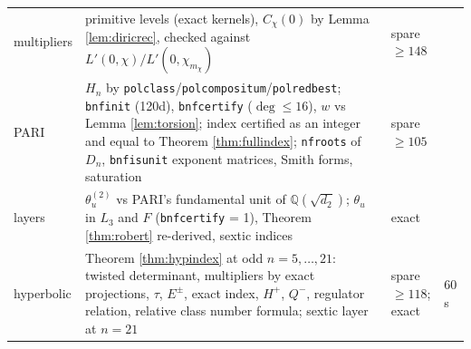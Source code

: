 \documentclass[11pt]{amsart}
\numberwithin{equation}{section}
\theoremstyle{plain}
\theoremstyle{definition}
\theoremstyle{remark}
\newcommand{\Q}{\mathbb{Q}}
\begin{document}
\begin{center}
\begin{tabular}{@{}p{2.6cm}p{5.8cm}p{2.0cm}p{1.4cm}@{}}
\quad multipliers & primitive levels (exact kernels), $C_\chi(0)$ by Lemma \ref{lem:diricrec}, checked against $L'(0,\chi)/L'(0,\chi_{m_\chi})$ & spare $\ge 148$ & \\
\quad PARI & $H_n$ by \texttt{polclass}/\texttt{polcompositum}/\texttt{polredbest}; \texttt{bnfinit} (120d), \texttt{bnfcertify} ($\deg \le 16$), $w$ vs Lemma \ref{lem:torsion}; index certified as an integer and equal to Theorem \ref{thm:fullindex}; \texttt{nfroots} of $D_n$, \texttt{bnfisunit} exponent matrices, Smith forms, saturation & spare $\ge 105$ & \\
\quad layers & $\theta^{(2)}_u$ vs PARI's fundamental unit of $\Q(\sqrt{d_2})$; $\theta_u$ in $L_3$ and $F$ (\texttt{bnfcertify} = 1), Theorem \ref{thm:robert} re-derived, sextic indices & exact & \\
\quad hyperbolic & Theorem \ref{thm:hypindex} at odd $n = 5, \dots, 21$: twisted determinant, multipliers by exact projections, $\tau$, $E^\pm$, exact index, $H^+$, $Q^-$, regulator relation, relative class number formula; sextic layer at $n = 21$ & spare $\ge 118$; exact & 60 s\\
\bottomrule
\end{tabular}
\end{center}

\end{document}
